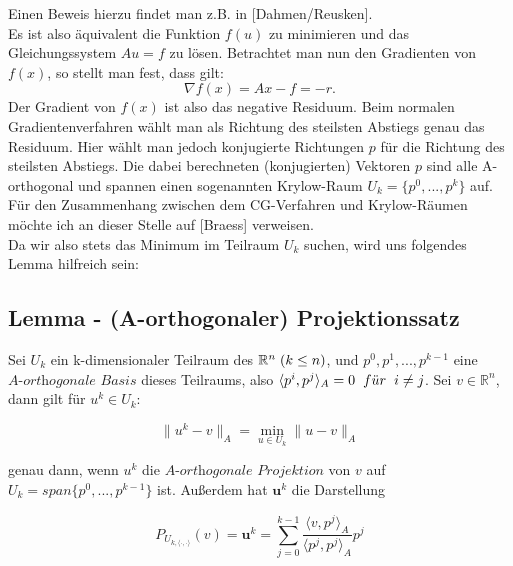 Einen Beweis hierzu findet man z.B. in [Dahmen/Reusken].\\
Es ist also äquivalent die Funktion $f(u)$ zu minimieren und das Gleichungssystem $Au = f$ zu lösen. Betrachtet man nun den Gradienten von $f(x)$, so stellt man fest, dass gilt:
\begin{equation}
\nabla f(x) = Ax - f = -r.
\end{equation}
Der Gradient von $f(x)$ ist also das negative Residuum. Beim normalen Gradientenverfahren wählt man als Richtung des steilsten Abstiegs genau das Residuum. Hier wählt man jedoch konjugierte Richtungen $p$ für die Richtung des steilsten Abstiegs. Die dabei berechneten (konjugierten) Vektoren $p$ sind alle A-orthogonal und spannen einen sogenannten Krylow-Raum $U_{k} = \{p^{0},...,p^{k}\}$ auf. Für den Zusammenhang zwischen dem CG-Verfahren und Krylow-Räumen möchte ich an dieser Stelle auf [Braess] verweisen.\\
Da wir also stets das Minimum im Teilraum $U_{k}$ suchen, wird uns folgendes Lemma hilfreich sein:

\label{img.CG}

\subsection{Lemma - (A-orthogonaler) Projektionssatz}\label{s.Projektionssatz}

Sei $U_{k}$ ein k-dimensionaler Teilraum des $\mathbb{R}^{n} \hspace{1mm} (k \le n)$, und $p^{0}, p^{1},...,p^{k-1}$ eine $\textit{A-orthogonale Basis}$ dieses Teilraums, also $\langle p^{i}, p^{j} \rangle _{A} = 0 \hspace{2mm} f\ddot{u}r \hspace{2mm} i \ne j$. Sei $v \in \mathbb{R}^{n}$, dann gilt für $u^{k} \in U_{k}$:

\begin{equation}
\|u^{k} - v\|_{A} = \underset{u \in U_{k}}{\min} \|u - v\|_{A}
\end{equation}

genau dann, wenn $u^{k}$ die $\textit{A-orthogonale Projektion}$ von $v$ auf $U_{k} = span\{p^{0},...,p^{k-1}\}$ ist. Außerdem hat $\textbf{u}^{k}$ die Darstellung

\begin{equation}
P_{U_{k,\langle \cdot,\cdot \rangle}}(v) = \textbf{u}^{k} = \sum_{j=0}^{k-1} \frac {\langle v, p^{j} \rangle _{A}} {\langle p^{j}, p^{j} \rangle _{A}} p^{j}
\end{equation}

